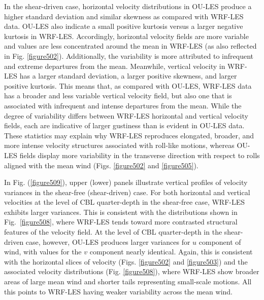 In the shear-driven case, horizontal velocity distributions in OU-LES produce a higher standard deviation and similar skewness as compared with WRF-LES data. OU-LES also indicate a small positive kurtosis versus a larger negative kurtosis in WRF-LES. Accordingly, horizontal velocity fields are more variable and values are less concentrated around the mean in WRF-LES (as also reflected in Fig. \autoref{figure502}). Additionally, the variability is more attributed to infrequent and extreme departures from the mean. Meanwhile, vertical velocity in WRF-LES has a larger standard deviation, a larger positive skewness, and larger positive kurtosis. This means that, as compared with OU-LES, WRF-LES data has a broader and less variable vertical velocity field, but also one that is associated with infrequent and intense departures from the mean. While the degree of variability differs between WRF-LES horizontal and vertical velocity fields, each are indicative of larger gustiness than is evident in OU-LES data. These statistics may explain why WRF-LES reproduces elongated, broader, and more intense velocity structures associated with roll-like motions, whereas OU-LES fields display more variability in the transverse direction with respect to rolls aligned with the mean wind (Figs. \autoref{figure502} and \autoref{figure505}).

In Fig. (\autoref{figure509}), upper (lower) panels illustrate vertical profiles of velocity variances in the shear-free (shear-driven) case. For both horizontal and vertical velocities at the level of CBL quarter-depth in the shear-free case, WRF-LES exhibits larger variances. This is consistent with the distributions shown in Fig.~\ref{figure508}, where WRF-LES tends toward more contrasted structural features of the velocity field. At the level of CBL quarter-depth in the shear-driven case, however, OU-LES produces larger variances for $u$ component of wind, with values for the $v$ component nearly identical. Again, this is consistent with the horizontal slices of velocity (Figs. \autoref{figure502} and \autoref{figure503}) and the associated velocity distributions (Fig. \autoref{figure508}), where WRF-LES show broader areas of large mean wind and shorter tails representing small-scale motions. All this points to WRF-LES having weaker variability across the mean wind.


